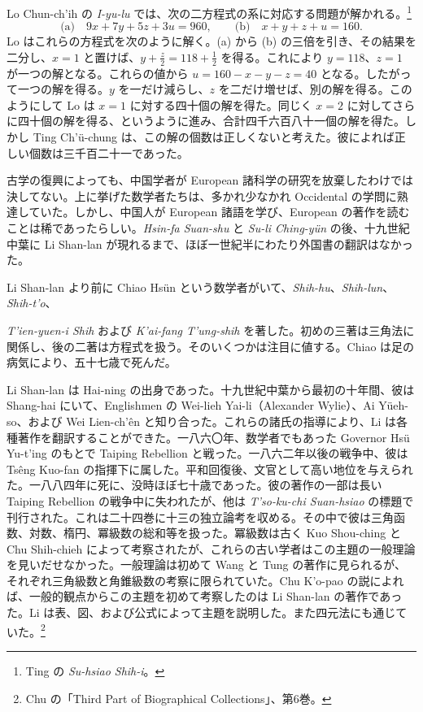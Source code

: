 \documentclass[11pt]{article}
\newcommand{\scanpage}[2]{\clearpage\setcounter{footnote}{0}\noindent{\footnotesize\color{gray}PDF #1 頁 · #2}\par\medskip}
\newcommand{\scanfooter}{}
\begin{document}
Lo Chun-ch'ih の \emph{I-yu-lu} では、次の二方程式の系に対応する問題が解かれる。\footnote{Ting の \emph{Su-hsiao Shih-i}。}
\[
\text{(a)}\quad 9x+7y+5z+3u=960,\qquad
\text{(b)}\quad x+y+z+u=160.
\]
Lo はこれらの方程式を次のように解く。(a) から (b) の三倍を引き、その結果を二分し、$x=1$ と置けば、$y+\frac{z}{2}=118+\frac{1}{2}$ を得る。これにより $y=118$、$z=1$ が一つの解となる。これらの値から $u=160-x-y-z=40$ となる。したがって一つの解を得る。$y$ を一だけ減らし、$z$ を二だけ増せば、別の解を得る。このようにして Lo は $x=1$ に対する四十個の解を得た。同じく $x=2$ に対してさらに四十個の解を得る、というように進み、合計四千六百八十一個の解を得た。しかし Ting Ch'ü-chung は、この解の個数は正しくないと考えた。彼によれば正しい個数は三千百二十一であった。

古学の復興によっても、中国学者が European 諸科学の研究を放棄したわけでは決してない。上に挙げた数学者たちは、多かれ少なかれ Occidental の学問に熟達していた。しかし、中国人が European 諸語を学び、European の著作を読むことは稀であったらしい。\emph{Hsin-fa Suan-shu} と \emph{Su-li Ching-yün} の後、十九世紀中葉に Li Shan-lan が現れるまで、ほぼ一世紀半にわたり外国書の翻訳はなかった。

Li Shan-lan より前に Chiao Hsün という数学者がいて、\emph{Shih-hu}、\emph{Shih-lun}、\emph{Shih-t'o}、
\scanfooter

\scanpage{0140}{第18章、印刷頁126}
\emph{T'ien-yuen-i Shih} および \emph{K'ai-fang T'ung-shih} を著した。初めの三著は三角法に関係し、後の二著は方程式を扱う。そのいくつかは注目に値する。Chiao は足の病気により、五十七歳で死んだ。

Li Shan-lan は Hai-ning の出身であった。十九世紀中葉から最初の十年間、彼は Shang-hai にいて、Englishmen の Wei-lieh Yai-li（Alexander Wylie）、Ai Yüeh-so、および Wei Lien-ch'ên と知り合った。これらの諸氏の指導により、Li は各種著作を翻訳することができた。一八六〇年、数学者でもあった Governor Hsü Yu-t'ing のもとで Taiping Rebellion と戦った。一八六二年以後の戦争中、彼は Tsêng Kuo-fan の指揮下に属した。平和回復後、文官として高い地位を与えられた。一八八四年に死に、没時ほぼ七十歳であった。彼の著作の一部は長い Taiping Rebellion の戦争中に失われたが、他は \emph{T'so-ku-chi Suan-hsiao} の標題で刊行された。これは二十四巻に十三の独立論考を収める。その中で彼は三角函数、対数、楕円、冪級数の総和等を扱った。冪級数は古く Kuo Shou-ching と Chu Shih-chieh によって考察されたが、これらの古い学者はこの主題の一般理論を見いだせなかった。一般理論は初めて Wang と Tung の著作に見られるが、それぞれ三角級数と角錐級数の考察に限られていた。Chu K'o-pao の説によれば、一般的観点からこの主題を初めて考察したのは Li Shan-lan の著作であった。Li は表、図、および公式によって主題を説明した。また四元法にも通じていた。\footnote{Chu の「Third Part of Biographical Collections」、第6巻。}
\end{document}

